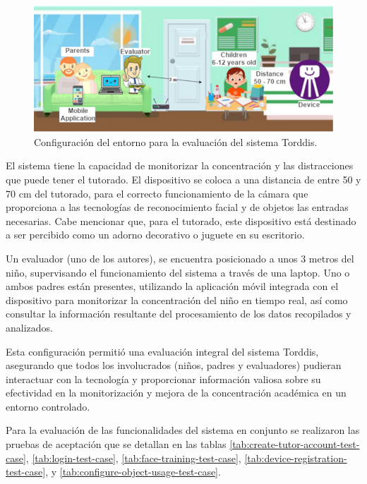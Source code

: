 				\begin{figure}[h]
					\centering
					\includegraphics[width=\linewidth]{figs/Figure_10}
					\caption{Configuración del entorno para la evaluación del sistema Torddis. \label{fig:ConfigEvaluation}} 
				\end{figure}
				
				El sistema tiene la capacidad de monitorizar la concentración y las distracciones que puede tener el tutorado. El dispositivo se coloca a una distancia de entre 50 y 70 cm del tutorado, para el correcto funcionamiento de la cámara que proporciona a las tecnologías de reconocimiento facial y de objetos las entradas necesarias. Cabe mencionar que, para el tutorado, este dispositivo está destinado a ser percibido como un adorno decorativo o juguete en su escritorio.
				
				Un evaluador (uno de los autores), se encuentra posicionado a unos 3 metros del niño, supervisando el funcionamiento del sistema a través de una laptop. Uno o ambos padres están presentes, utilizando la aplicación móvil integrada con el dispositivo para monitorizar la concentración del niño en tiempo real, así como consultar la información resultante del procesamiento de los datos recopilados y analizados.
				
				Esta configuración permitió una evaluación integral del sistema Torddis, asegurando que todos los involucrados (niños, padres y evaluadores) pudieran interactuar con la tecnología y proporcionar información valiosa sobre su efectividad en la monitorización y mejora de la concentración académica en un entorno controlado.
				
				Para la evaluación de las funcionalidades del sistema en conjunto se realizaron las pruebas de aceptación que se detallan en las tablas \ref{tab:create-tutor-account-test-case}, \ref{tab:login-test-case}, \ref{tab:face-training-test-case}, \ref{tab:device-registration-test-case}, y \ref{tab:configure-object-usage-test-case}.
				
